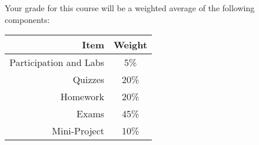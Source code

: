 \documentclass[11pt]{article}
\begin{document}
	Your grade for this course will be a weighted average of the following components:
	
	
	\begin{table}[!h]
		\centering
		\begin{tabular}{r c}
			\toprule
			Item & Weight \\
			\midrule
			Participation and Labs & 5\% \\
			\cmidrule(r){1-2}
            Quizzes & 20\% \\
			\cmidrule(r){1-2}
			Homework & 20\% \\
			\cmidrule(r){1-2}
			Exams & 45\% \\
			\cmidrule(r){1-2}
			Mini-Project & 10\% \\
			\bottomrule
		\end{tabular}
	\end{table}
	
\end{document}
